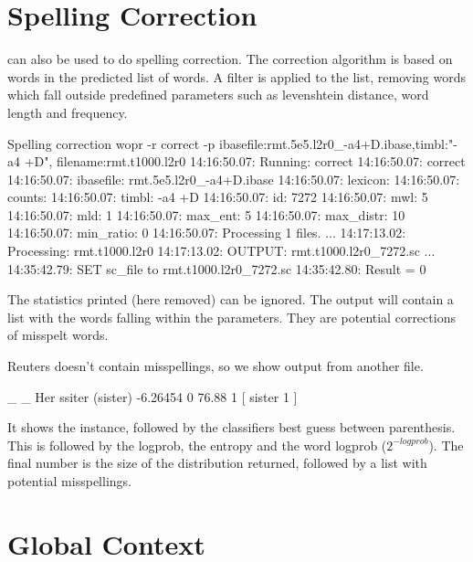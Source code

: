 \documentclass[a4paper,10pt,twoside]{report}
\begin{document}
\section{Spelling Correction}

\Wopr{} can also be used to do spelling correction. The correction
algorithm is based on words in the predicted list of words. A filter
is applied to the list, removing words which fall outside predefined
parameters such as levenshtein distance, word length and frequency.

\begin{bash}{Spelling correction}
wopr -r correct -p ibasefile:rmt.5e5.l2r0_-a4+D.ibase,timbl:"-a4 +D",
                   filename:rmt.t1000.l2r0
14:16:50.07: Running: correct
14:16:50.07: correct
14:16:50.07:  ibasefile:  rmt.5e5.l2r0_-a4+D.ibase
14:16:50.07:  lexicon:    
14:16:50.07:  counts:     
14:16:50.07:  timbl:      -a4 +D
14:16:50.07:  id:         7272
14:16:50.07:  mwl:        5
14:16:50.07:  mld:        1
14:16:50.07:  max_ent:    5
14:16:50.07:  max_distr:  10
14:16:50.07:  min_ratio:  0
14:16:50.07: Processing 1 files.
...
14:17:13.02: Processing: rmt.t1000.l2r0
14:17:13.02: OUTPUT:     rmt.t1000.l2r0_7272.sc
...
14:35:42.79:  SET sc_file to rmt.t1000.l2r0_7272.sc
14:35:42.80: Result = 0
\end{bash}

The statistics printed (here removed) can be ignored. The output will
contain a list with the words falling within the parameters. They are
potential corrections of misspelt words.

Reuters doesn't contain misspellings, so we show output from another
file.

\begin{wout}{}
_ _ Her ssiter (sister) -6.26454 0 76.88 1 [ sister 1 ]
\end{wout}

It shows the instance, followed by the classifiers best guess between
parenthesis. This is followed by the logprob, the entropy and the word
logprob ($2^{-logprob}$). The final number is the size of the \Timbl{}
distribution returned, followed by a list with potential misspellings.

\section{Global Context}
\end{document}

